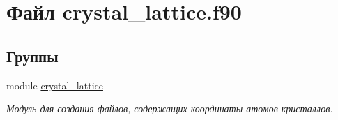 \hypertarget{crystal__lattice_8f90}{}\section{Файл crystal\+\_\+lattice.\+f90}
\label{crystal__lattice_8f90}
\subsection*{Группы}
\begin{DoxyCompactItemize}
\item 
module \mbox{\hyperlink{namespacecrystal__lattice}{crystal\+\_\+lattice}}
\begin{DoxyCompactList}\small\item\em Модуль для создания файлов, содержащих координаты атомов кристаллов. \end{DoxyCompactList}\end{DoxyCompactItemize}
